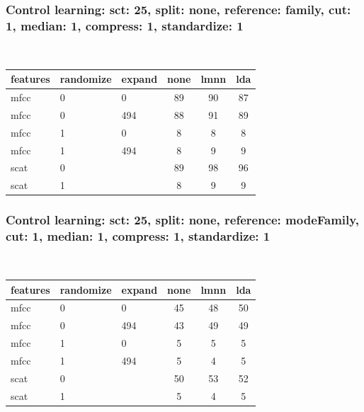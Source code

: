\documentclass{beamer}
\begin{document}
\begin{frame}\frametitle{Control learning: sct: 25, split: none, reference: family, cut: 1, median: 1, compress: 1, standardize: 1}

\begin{table}
\begin{center}
\
\setlength{\tabcolsep}{.16667em}
\begin{tabular}{lllccc}
features & randomize & expand & none & lmnn & lda \\
\hline
mfcc & 0 &    0 & 89 & 90 & 87 \\
mfcc & 0 &  494 & 88 & 91 & 89 \\
mfcc & 1 &    0 &  8 &  8 &  8 \\
mfcc & 1 &  494 &  8 &  9 &  9 \\
scat & 0 &  & 89 & 98 & 96 \\
scat & 1 &  &  8 &  9 &  9 \\
\end{tabular}
\end{center}
\label{sc25SpnoRefaCu1Me1Co1St1}
\end{table}

\end{frame}
\begin{frame}\frametitle{Control learning: sct: 25, split: none, reference: modeFamily, cut: 1, median: 1, compress: 1, standardize: 1}

\begin{table}
\begin{center}
\
\setlength{\tabcolsep}{.16667em}
\begin{tabular}{lllccc}
features & randomize & expand & none & lmnn & lda \\
\hline
mfcc & 0 &    0 & 45 & 48 & 50 \\
mfcc & 0 &  494 & 43 & 49 & 49 \\
mfcc & 1 &    0 &  5 &  5 &  5 \\
mfcc & 1 &  494 &  5 &  4 &  5 \\
scat & 0 &  & 50 & 53 & 52 \\
scat & 1 &  &  5 &  4 &  5 \\
\end{tabular}
\end{center}
\label{sc25SpnoRemofaCu1Me1Co1St1}
\end{table}

\end{frame}

\clearpage
\end{document}
